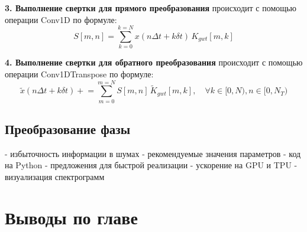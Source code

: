 \textbf{3. Выполнение свертки для прямого преобразования} происходит с помощью операции Conv1D по формуле:
\begin{equation}
  S[m, n] = \sum \limits_{k=0}^{k=N} x(n\Delta t + k\delta t) \, K_{gwt}[m, k]
\end{equation}

\textbf{4. Выполнение свертки для обратного преобразования} происходит с помощью операции Conv1DTranspose по формуле:
\begin{equation}
  \tilde{x}(n\Delta t + k\delta t) \mathrel{+}= \sum \limits_{m=0}^{m=N} S[m, n] \, \tilde{K}_{gwt}[m, k], \quad 
  \forall k \in [0, N), n \in [0, N_T)
\end{equation}



\subsection{Преобразование фазы}



\begin{markdown}
 - избыточность информации в шумах
 - рекомендуемые значения параметров
 - код на Python
 - предложения для быстрой реализации
 - ускорение на GPU и TPU
 - визуализация спектрограмм
\end{markdown}

\section{Выводы по главе}
